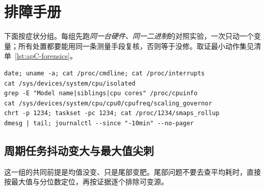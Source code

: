 \documentclass[12pt,a4paper,fontset=fandol]{ctexbook}
\begin{document}
\section{排障手册}

下面按症状分组。每组先跑\emph{同一台硬件、同一二进制}的对照实验，一次只动一个变量；所有处置都要能用同一条测量手段复核，否则等于没修。取证最小动作集见清单~\ref{lst:apC-forensics}。

\begin{lstlisting}[style=shellstyle,caption={症状发作时先抓的最小证据集},label={lst:apC-forensics}]
date; uname -a; cat /proc/cmdline; cat /proc/interrupts
cat /sys/devices/system/cpu/isolated
grep -E "Model name|siblings|cpu cores" /proc/cpuinfo
cat /sys/devices/system/cpu/cpu0/cpufreq/scaling_governor
chrt -p 1234; taskset -pc 1234; cat /proc/1234/smaps_rollup
dmesg | tail; journalctl --since "-10min" --no-pager
\end{lstlisting}

\subsection{周期任务抖动变大与最大值尖刺}

这一组的共同前提是均值没变、只是尾部变肥。尾部问题不要去查平均耗时，直接按最大值与分位数定位，再按证据逐个排除可变源。
\end{document}
